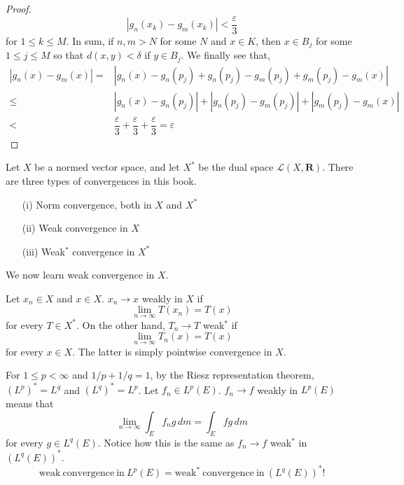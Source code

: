 \begin{proof}
\[|g_{n}(x_{k})-g_{m}(x_{k})|<\dfrac{\varepsilon }{3}\]
for $1\leq k\leq M$. In sum, if $n,m>N$ for some $N$ and $x\in K$, then $x\in B_{j}$ for some $1\leq j\leq M$ so that $d(x,y)<\delta $ if $y\in B_{j}$. We finally see that, 
\begin{align*}
|g_{n}(x)-g_{m}(x)|=&|g_{n}(x)-g_{n}(p_{j})+g_{n}(p_{j})-g_{m}(p_{j})+g_{m}(p_{j})-g_{m}(x)|\\
\leq &|g_{n}(x)-g_{n}(p_{j})|+|g_{n}(p_{j})-g_{m}(p_{j})|+|g_{m}(p_{j})-g_{m}(x)|\\<&\dfrac{\varepsilon }{3}+\dfrac{\varepsilon }{3}+\dfrac{\varepsilon }{3}=\varepsilon 
\end{align*}
\end{proof}
\vspace{2ex}
\begin{rmk}
Let $X$ be a normed vector space, and let $X^{*}$ be the dual space $\mathcal{L}(X,{\bm R})$. There are three types of convergences in this book.
\begin{itemize}
\item[(i)] Norm convergence, both in $X$ and $X^{*}$
\item[(ii)] Weak convergence in $X$
\item[(iii)] Weak$^{*}$ convergence in $X^{*}$
\end{itemize}
We now learn weak convergence in $X$. 
\end{rmk}
\vspace{2ex}
\begin{defi}
Let $x_{n}\in X$ and $x\in X$. $x_{n}\rightarrow x$ weakly in $X$ if 
\[\lim _{n\rightarrow \infty }T(x_{n})=T(x)\] 
for every $T\in X^{*}$. On the other hand, $T_{n}\rightarrow T$ weak$^{*}$ if 
\[\lim _{n\rightarrow \infty }T_{n}(x)=T(x)\]
for every $x\in X$. The latter is simply pointwise convergence in $X$.
\end{defi}
\vspace{2ex}
\begin{rmk}
For $1\leq p<\infty $ and $1/p+1/q=1$, by the Riesz representation theorem, $(L^{p})^{*}=L^{q}$ and $(L^{q})^{*}=L^{p}$. Let $f_{n}\in L^{p}(E)$. $f_{n}\rightarrow f$ weakly in $L^{p}(E)$ means that
\[\lim _{n\rightarrow \infty }\int _{E}f_{n}g\,d m=\int _{E}fg\,d m\]
for every $g\in L^{q}(E)$. Notice how this is the same as $f_{n}\rightarrow f$ weak$^{*}$ in $(L^{q}(E))^{*}$. 
\[\mathrm{weak\ convergence\ in\ }L^{p}(E)=\mathrm{weak}^{*}\ \mathrm{convergence\ in\ }(L^{q}(E))^{*}!\]
\end{rmk}
\vspace{2ex}
